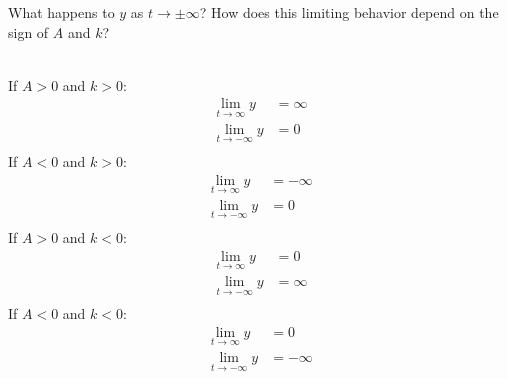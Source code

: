 What happens to $y$ as $t \to \pm\infty$? How does this limiting behavior depend on the sign of $A$ and $k$?

\begin{solution}\ \\
If $A > 0$ and $k > 0$:
\begin{align*}
    \lim_{t \to \infty} y &= \infty \\
    \lim_{t \to -\infty} y &= 0 \\
\end{align*}
If $A < 0$ and $k > 0$:
\begin{align*}
    \lim_{t \to \infty} y &= -\infty \\
    \lim_{t \to -\infty} y &= 0 \\
\end{align*}
If $A > 0$ and $k < 0$:
\begin{align*}
    \lim_{t \to \infty} y &= 0 \\
    \lim_{t \to -\infty} y &= \infty \\
\end{align*}
If $A < 0$ and $k < 0$:
\begin{align*}
    \lim_{t \to \infty} y &= 0 \\
    \lim_{t \to -\infty} y &= -\infty \\
\end{align*}
\end{solution}